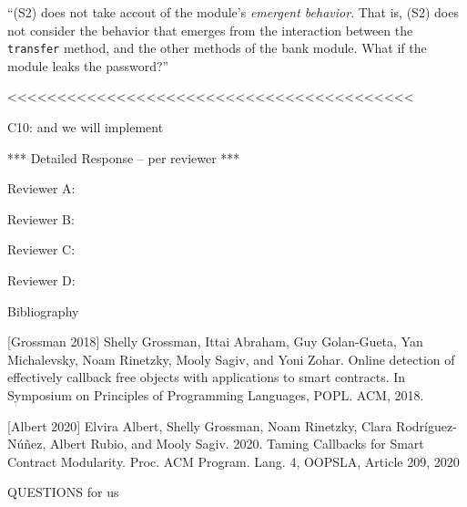 ``(S2) does not take accout of the module's \emph{emergent behavior}. That is, (S2) does not consider the behavior that emerges from the interaction between the 
\texttt{transfer} method, and the other methods of the bank module. What if the module leaks the password?''

<<<<<<<<<<<<<<<<<<<<<<<<<<<<<<<<<<<<<<<<<

C10: and we will implement
 


*** Detailed Response -- per reviewer ***

Reviewer A:

Reviewer B:

Reviewer C:

Reviewer D:

Bibliography

[Grossman 2018] Shelly Grossman, Ittai Abraham, Guy Golan-Gueta, Yan Michalevsky, Noam Rinetzky, Mooly Sagiv, and Yoni Zohar. Online detection of effectively callback free objects with applications to smart contracts. In Symposium on Principles of Programming Languages, POPL. ACM, 2018.

[Albert 2020] Elvira Albert, Shelly Grossman, Noam Rinetzky, Clara Rodríguez-Núñez, Albert Rubio, and Mooly Sagiv. 2020. Taming Callbacks for Smart Contract Modularity. Proc. ACM Program. Lang. 4, OOPSLA, Article 209, 2020


QUESTIONS for us